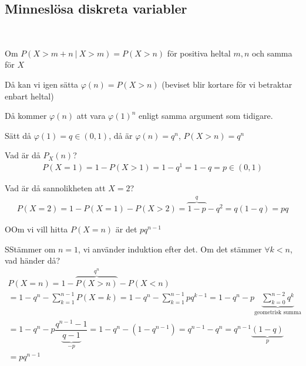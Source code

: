 \subsection{Minneslösa diskreta variabler}\hfill\\\par
\noindent Om $P(X>m+n\:|\:X>m) = P(X>n)$ för positiva heltal $m,n$ och samma för $X$\par
\noindent Då kan vi igen sätta $\varphi(n) = P(X>n)$ (beviset blir kortare för vi betraktar enbart heltal)
\par\bigskip
\noindent Då kommer $\varphi(n)$ att vara $\varphi(1)^n$ enligt samma argument som tidigare.\par
\noindent Sätt då $\varphi(1) = q\in(0,1)$, då är $\varphi(n) = q^n$, $P(X>n) = q^n$
\par\bigskip
\noindent Vad är då $P_X(n)$?
\begin{equation*}
  \begin{gathered}
    P(X=1) = 1-P(X>1) = 1-q^1 = 1-q = p\in(0,1)
  \end{gathered}
\end{equation*}
\par\bigskip
\noindent Vad är då sannolikheten att $X=2$?
\begin{equation*}
  \begin{gathered}
    P(X=2) = 1-P(X=1)-P(X>2) = \overbrace{1-p}^{\text{$q$}}-q^2 = q(1-q) = pq
  \end{gathered}
\end{equation*}
\newpage
\begin{theo}
  OOm vi vill hitta $P(X=n)$ är det $pq^{n-1}$
\end{theo}
\par\bigskip
\begin{prf}
  SStämmer om $n=1$, vi använder induktion efter det. Om det stämmer $\forall k<n$, vad händer då?
  \begin{equation*}
    \begin{gathered}
      P(X=n) = 1-\overbrace{P(X>n)}^{\text{$q^n$}}-P(X<n)\\
      = 1-q^n-\sum_{k=1}^{n-1}P(X=k) = 1-q^n-\sum_{k=1}^{n-1}pq^{k-1}
      = 1-q^n-p\underbrace{\sum_{k=0}^{n-2}q^k}_{\text{geometrisk summa}}\\
      = 1-q^n-p\dfrac{q^{n-1}-1}{\underbrace{q-1}_{\text{$-p$}}} = 1-q^n-(1-q^{n-1}) = q^{n-1}-q^{n} = q^{n-1}\underbrace{(1-q)}_{\text{$p$}}\\
      = pq^{n-1}
    \end{gathered}
  \end{equation*}
\end{prf}
